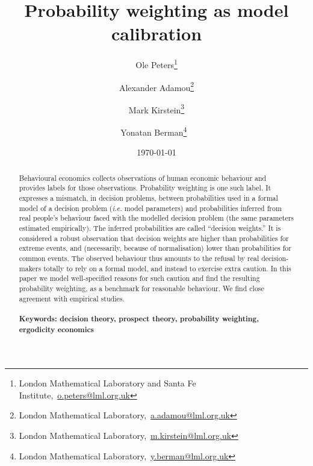 \documentclass[11pt]{article}
\newcommand{\bc}{\begin{center}}
\newcommand{\ec}{\end{center}}
\newcommand{\red}[1]{\textcolor{red} {#1}}
\newcommand{\ie}{{\it i.e.}\xspace}
\numberwithin{equation}{section}
\begin{document}
\begin{titlepage}
\title{Probability weighting as model calibration}
\author{Ole Peters\footnote{London Mathematical Laboratory and Santa Fe Institute,~\url{o.peters@lml.org.uk}} \and Alexander Adamou\footnote{London Mathematical Laboratory,~\url{a.adamou@lml.org.uk}} \and Mark Kirstein\footnote{London Mathematical Laboratory,~\url{m.kirstein@lml.org.uk}} \and Yonatan Berman\footnote{London Mathematical Laboratory,~\url{y.berman@lml.org.uk}} \,\, %
}
\date{\today}
\maketitle


\begin{abstract}
\noindent 
Behavioural economics collects observations of human economic behaviour and provides labels for those observations. 
Probability weighting is one such label. It expresses a mismatch, in decision problems, between probabilities used in a formal model of a decision problem (\ie model parameters) and probabilities inferred from real people's behaviour faced with the modelled decision problem (the same parameters estimated empirically). The inferred probabilities are called ``decision weights.'' 
It is considered a robust observation that decision weights are higher than probabilities for extreme events, and (necessarily, because of normalisation) lower than probabilities for common events.
The observed behaviour thus amounts to the refusal by real decision-makers totally to rely on a formal model, and instead to exercise extra caution. In this paper we model well-specified reasons for such caution and find the resulting probability weighting, as a benchmark for reasonable behaviour. We find close agreement with empirical studies.
\\
\\


\noindent\textbf{Keywords: decision theory, prospect theory, probability weighting, ergodicity economics}

\end{abstract}
\setcounter{page}{0}
\thispagestyle{empty}
\end{titlepage}
\pagebreak \newpage
\end{document}
